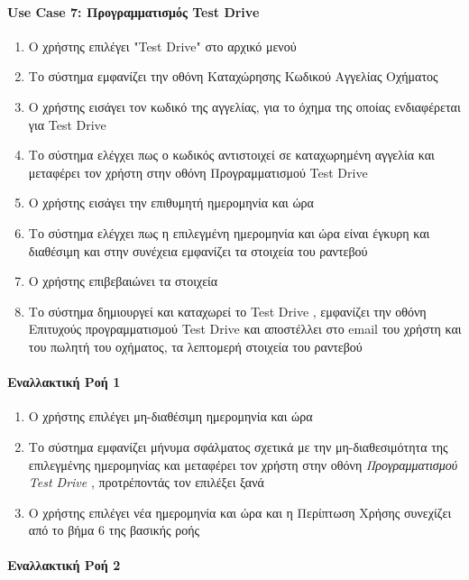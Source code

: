\documentclass{../ol-softwaremanual}
\begin{document}
	
	\paragraph{\en Use Case 7: \gr Προγραμματισμός \en Test Drive \gr}
	
	\begin{enumerate}
		\item Ο χρήστης επιλέγει \en"Test Drive" \gr στο αρχικό μενού
		\item Το σύστημα εμφανίζει την οθόνη Καταχώρησης Κωδικού Αγγελίας Οχήματος
		\item Ο χρήστης εισάγει τον κωδικό της αγγελίας, για το όχημα της οποίας ενδιαφέρεται για \en Test Drive \gr
		\item Το σύστημα ελέγχει πως ο κωδικός αντιστοιχεί σε καταχωρημένη αγγελία και μεταφέρει τον χρήστη στην οθόνη Προγραμματισμού \en Test Drive \gr
		\item Ο χρήστης εισάγει την επιθυμητή ημερομηνία και ώρα
		\item Το σύστημα ελέγχει πως η επιλεγμένη ημερομηνία και ώρα είναι έγκυρη και διαθέσιμη και στην συνέχεια εμφανίζει τα στοιχεία του ραντεβού
		\item Ο χρήστης επιβεβαιώνει τα στοιχεία
		\item Το σύστημα δημιουργεί και καταχωρεί το \en Test Drive \gr, εμφανίζει την οθόνη Επιτυχούς προγραμματισμού \en Test Drive \gr και αποστέλλει στο \en email \gr του χρήστη και του πωλητή του οχήματος, τα λεπτομερή στοιχεία του ραντεβού 
	\end{enumerate}
	
	\paragraph{Εναλλακτική Ροή 1}
	
	\begin{enumerate}
		\item Ο χρήστης επιλέγει μη-διαθέσιμη ημερομηνία και ώρα
		\item Το σύστημα εμφανίζει μήνυμα σφάλματος σχετικά με την μη-διαθεσιμότητα της επιλεγμένης ημερομηνίας και μεταφέρει τον χρήστη στην οθόνη \textit{Προγραμματισμού \en Test Drive \gr}, προτρέποντάς τον επιλέξει ξανά
		\item Ο χρήστης επιλέγει νέα ημερομηνία και ώρα και η Περίπτωση Χρήσης συνεχίζει από το βήμα 6 της βασικής ροής
	\end{enumerate}
	
	
	\paragraph{Εναλλακτική Ροή 2}
	
\end{document}
